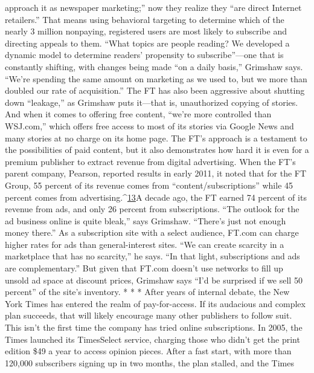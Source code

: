 approach it as newspaper marketing;'' now they realize they ``are direct Internet
retailers.''
That means using behavioral targeting to determine which of the nearly 3
million nonpaying, registered users are most likely to subscribe and directing appeals
to them. ``What topics are people reading? We developed a dynamic model
to determine readers' propensity to subscribe''—one that is constantly shifting,
with changes being made ``on a daily basis,'' Grimshaw says. ``We're spending the
same amount on marketing as we used to, but we more than doubled our rate
of acquisition.''
The FT has also been aggressive about shutting down ``leakage,'' as Grimshaw
puts it—that is, unauthorized copying of stories. And when it comes to offering
free content, ``we're more controlled than WSJ.com,'' which offers free access to
most of its stories via Google News and many stories at no charge on its home
page.
The FT's approach is a testament to the possibilities of paid content, but it also
demonstrates how hard it is even for a premium publisher to extract revenue
from digital advertising. When the FT's parent company, Pearson, reported results
in early 2011, it noted that for the FT Group, 55 percent of its revenue comes
from ``content/subscriptions'' while 45 percent comes from advertising.^{\href{#endnotes-chapter-5}{13}}A decade
ago, the FT earned 74 percent of its revenue from ads, and only 26 percent
from subscriptions.
``The outlook for the ad business online is quite bleak,'' says Grimshaw. ``There's
just not enough money there.'' As a subscription site with a select audience,
FT.com can charge higher rates for ads than general-interest sites. ``We can create
scarcity in a marketplace that has no scarcity,'' he says. ``In that light, subscriptions
and ads are complementary.'' But given that FT.com doesn't use networks to fill
up unsold ad space at discount prices, Grimshaw says ``I'd be surprised if we sell
50 percent'' of the site's inventory.
* * *
After years of internal debate, the New York Times has entered the realm of
pay-for-access. If its audacious and complex plan succeeds, that will likely encourage
many other publishers to follow suit.
This isn't the first time the company has tried online subscriptions. In 2005,
the Times launched its TimesSelect service, charging those who didn't get the
print edition \$49 a year to access opinion pieces. After a fast start, with more than
120,000 subscribers signing up in two months, the plan stalled, and the Times
